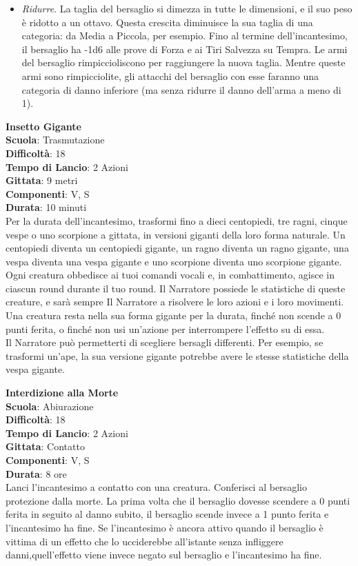 \begin{multicols}{2}
\begin{itemize}
\item
\textit{Ridurre}. La taglia del bersaglio si dimezza in tutte le dimensioni, e il suo peso è ridotto a un ottavo. Questa crescita diminuisce la sua taglia di una categoria: da Media a Piccola, per esempio. Fino al termine dell'incantesimo, il bersaglio ha -1d6 alle prove di Forza e ai Tiri Salvezza su Tempra. Le armi del bersaglio rimpiccioliscono per raggiungere la nuova taglia. Mentre queste armi sono rimpicciolite, gli attacchi del bersaglio con esse faranno una categoria di danno inferiore (ma senza ridurre il danno dell'arma a meno di 1).
\end{itemize}

\medskip\textbf{Insetto Gigante}\\
\textbf{Scuola}: Trasmutazione\\
\textbf{Difficoltà}: 18\\
\textbf{Tempo di Lancio}: 2 Azioni\\
\textbf{Gittata}: 9 metri\\
\textbf{Componenti}: V, S\\
\textbf{Durata}: 10 minuti\\
Per la durata dell'incantesimo, trasformi fino a dieci centopiedi, tre ragni, cinque vespe o uno scorpione a gittata, in versioni giganti della loro forma naturale. Un centopiedi diventa un centopiedi gigante, un ragno diventa un ragno gigante, una vespa diventa una vespa gigante e uno scorpione diventa uno scorpione gigante. Ogni creatura obbedisce ai tuoi comandi vocali e, in combattimento, agisce in ciascun round durante il tuo round. Il Narratore possiede le statistiche di queste creature, e sarà sempre Il Narratore a risolvere le loro azioni e i loro movimenti. Una creatura resta nella sua forma gigante per la durata, finché non scende a 0 punti ferita, o finché non usi un'azione per interrompere l'effetto su di essa.\\
Il Narratore può permetterti di scegliere bersagli differenti. Per esempio, se trasformi un'ape, la sua versione gigante potrebbe avere le stesse statistiche della vespa gigante.

\medskip\textbf{Interdizione alla Morte}\\
\textbf{Scuola}: Abiurazione\\
\textbf{Difficoltà}: 18\\
\textbf{Tempo di Lancio}: 2 Azioni\\
\textbf{Gittata}: Contatto\\
\textbf{Componenti}: V, S\\
\textbf{Durata}: 8 ore\\
Lanci l'incantesimo a contatto con una creatura. Conferisci al bersaglio protezione dalla morte. La prima volta che il bersaglio dovesse scendere a 0 punti ferita in seguito al danno subito, il bersaglio scende invece a 1 punto ferita e l'incantesimo ha fine. Se l'incantesimo è ancora attivo quando il bersaglio è vittima di un effetto che lo ucciderebbe all'istante senza infliggere danni,quell'effetto viene invece negato sul bersaglio e l'incantesimo ha fine.


\end{multicols}
